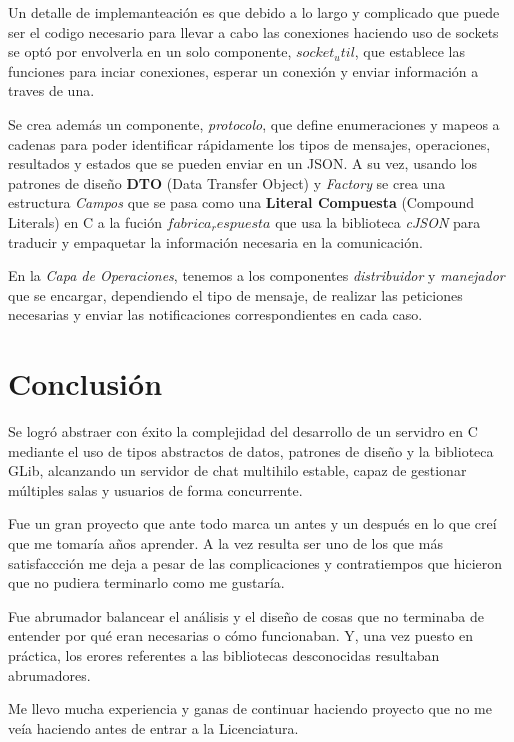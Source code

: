 \documentclass{replab}
\begin{document}
    Un detalle de implemanteación es que debido a lo largo y
    complicado que puede ser el codigo necesario para llevar a cabo
    las conexiones haciendo uso de sockets se optó por envolverla en
    un solo componente, \textit{$socket_util$}, que establece las
    funciones para inciar conexiones, esperar un conexión y enviar
    información a traves de una.
    
    Se crea además un componente, \textit{protocolo}, que define
    enumeraciones y mapeos a cadenas para poder identificar
    rápidamente los tipos de mensajes, operaciones, resultados y
    estados que se pueden enviar en un JSON. A su vez, usando los
    patrones de diseño \textbf{DTO} (Data Transfer Object) y
    \textit{Factory} se crea una estructura \textit{Campos} que se
    pasa como una \textbf{Literal Compuesta} (Compound Literals) en C
    a la fución \textit{$fabrica_respuesta$} que usa la biblioteca
    \textit{cJSON} para traducir y empaquetar la información necesaria
    en la comunicación.

    En la \textit{Capa de Operaciones}, tenemos a los componentes
    \textit{distribuidor} y \textit{manejador} que se encargar,
    dependiendo el tipo de mensaje, de realizar las peticiones
    necesarias y enviar las notificaciones correspondientes en cada
    caso.

    \section{Conclusión}

    Se logró abstraer con éxito la complejidad del desarrollo de un
    servidro en C mediante el uso de tipos abstractos de datos,
    patrones de diseño y la biblioteca GLib, alcanzando un servidor de
    chat multihilo estable, capaz de gestionar múltiples salas y
    usuarios de forma concurrente.

    Fue un gran proyecto que ante todo marca un antes y un después en
    lo que creí que me tomaría años aprender. A la vez resulta ser uno
    de los que más satisfaccción me deja a pesar de las complicaciones
    y contratiempos que hicieron que no pudiera terminarlo como me
    gustaría. 

    Fue abrumador balancear el análisis y el diseño de cosas que no
    terminaba de entender por qué eran necesarias o cómo
    funcionaban. Y, una vez puesto en práctica, los erores referentes
    a las bibliotecas desconocidas resultaban abrumadores.

    Me llevo mucha experiencia y ganas de continuar haciendo proyecto
    que no me veía haciendo antes de entrar a la Licenciatura.

    \printbibliography[heading=bibintoc]
	
\end{document}

